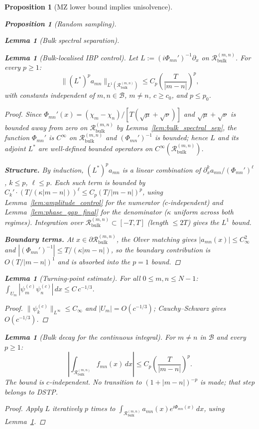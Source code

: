\documentclass[12pt,a4paper]{amsart}
\newtheorem{lemma}[theorem]{Lemma}
\newtheorem{proposition}[theorem]{Proposition}
\theoremstyle{definition}
\newcommand{\Rbulk}{\mathcal{R}_{\mathrm{bulk}}}
\begin{document}
\begin{proposition}[MZ lower bound implies unisolvence]
\begin{proposition}[Random sampling]
\begin{lemma}[Bulk spectral separation]
\begin{lemma}[Bulk-localised IBP control]\label{lem:ibp_uniform}
Let $L:=(i\Phi_{mn}')^{-1}\partial_x$ on $\Rbulk^{(m,n)}$.
For every $p\ge 1$:
\[
  \|(L^*)^p a_{mn}\|_{L^1(\Rbulk^{(m,n)})}
  \le C_p\left(\frac{T}{|m-n|}\right)^p,
\]
with constants independent of $m,n\in\mathcal{B}$, $m\ne n$,
$c\ge c_0$, and $p\le p_0$.
\end{lemma}
\begin{proof}
Since $\Phi_{mn}'(x)=(\chi_m-\chi_n)/[T(\sqrt{\mu}+\sqrt{\nu})]$
and $\sqrt{\mu}+\sqrt{\nu}$ is bounded away from zero on
$\Rbulk^{(m,n)}$ by Lemma~\ref{lem:bulk_spectral_sep}, the function
$\Phi_{mn}'$ is $C^\infty$ on $\Rbulk^{(m,n)}$ and
$(\Phi_{mn}')^{-1}$ is bounded; hence $L$ and its adjoint $L^*$
are well-defined bounded operators on $C^\infty(\Rbulk^{(m,n)})$.

\noindent\textbf{Structure.}
By induction, $(L^*)^p a_{mn}$ is a linear combination of
$\partial_x^k a_{mn}/(\Phi_{mn}')^\ell$, $k\le p$, $\ell\le p$.
Each such term is bounded by
$C_k'\cdot(T/(\kappa|m-n|))^\ell\le C_p(T/|m-n|)^p$,
using Lemma~\ref{lem:amplitude_control} for the numerator
($c$-independent) and Lemma~\ref{lem:phase_gap_final} for the
denominator ($\kappa$ uniform across both regimes).
Integration over $\Rbulk^{(m,n)}\subset[-T,T]$
(length $\le 2T$) gives the $L^1$ bound.

\noindent\textbf{Boundary terms.}
At $x\in\partial\Rbulk^{(m,n)}$, the Olver matching gives
$|a_{mn}(x)|\le C_\infty^2$ and
$|(\Phi_{mn}')^{-1}|\le T/(\kappa|m-n|)$,
so the boundary contribution is $O(T/|m-n|)^1$ and is absorbed into
the $p=1$ bound.
\end{proof}

\begin{lemma}[Turning-point estimate]\label{lem:turning_revised}
For all $0\le m,n\le N-1$:
$\int_{U_m}|\psi_m^{(c)}\psi_n^{(c)}|\,dx\le C\,c^{-1/3}$.
\end{lemma}
\begin{proof}
$\|\psi_k^{(c)}\|_{L^\infty}\le C_\infty$ \cite{BonamiKaroui2014}
and $|U_m|=O(c^{-1/3})$; Cauchy--Schwarz gives $O(c^{-1/3})$.
\end{proof}

\begin{lemma}[Bulk decay for the continuous integral]%
\label{lem:bulk_decay}
For $m\ne n$ in $\mathcal{B}$ and every $p\ge 1$:
\[
  \left|\int_{\Rbulk^{(m,n)}}f_{mn}(x)\,dx\right|
  \le C_p\left(\frac{T}{|m-n|}\right)^p.
\]
The bound is $c$-independent. No transition to
$(1+|m-n|)^{-p}$ is made; that step belongs to DSTP.
\end{lemma}
\begin{proof}
Apply $L$ iteratively $p$ times to
$\int_{\Rbulk^{(m,n)}}a_{mn}(x)e^{i\Phi_{mn}(x)}\,dx$,
using Lemma~\ref{lem:ibp_uniform}.
\end{proof}


\end{lemma}
\end{proposition}
\end{proposition}
\end{document}
